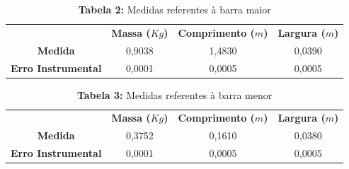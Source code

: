 \documentclass{article}
\begin{document}
\begin{table}[!ht]
	\begin{center}
		\caption*{\textbf{Tabela 2:} Medidas referentes à barra maior}
		\begin{tabular}{| c | c | c | c |}
			\cline{2-4} \multicolumn{0}{c|}{ } & \multicolumn{1}{c|}{\textbf{Massa ($Kg$)}} & \multicolumn{1}{c|}{\textbf{Comprimento ($m$)}} & \multicolumn{1}{c|}{\textbf{Largura ($m$)}}  \\  \cline{1-4}
			\multicolumn{0}{|c|}{\textbf{Medida}} & 0,9038 & 1,4830 & 0,0390\\ \hline
			\multicolumn{0}{|c|}{\textbf{Erro Instrumental}} & 0,0001 & 0,0005 & 0,0005\\ \hline
		\end{tabular}
	\end{center}
\end{table}

\begin{table}[!ht]
	\begin{center}
		\caption*{\textbf{Tabela 3:} Medidas referentes à barra menor}
		\begin{tabular}{| c | c | c | c |}
			\cline{2-4} \multicolumn{0}{c|}{ } & \multicolumn{1}{c|}{\textbf{Massa ($Kg$)}} & \multicolumn{1}{c|}{\textbf{Comprimento ($m$)}} & \multicolumn{1}{c|}{\textbf{Largura ($m$)}}  \\  \cline{1-4}
			\multicolumn{0}{|c|}{\textbf{Medida}} & 0,3752 & 0,1610 & 0,0380\\ \hline
			\multicolumn{0}{|c|}{\textbf{Erro Instrumental}} & 0,0001 & 0,0005 & 0,0005\\ \hline
		\end{tabular}
	\end{center}
\end{table}

\afterpage {\clearpage}
\end{document}
